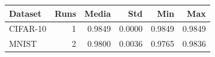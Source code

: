 \begin{tabular}{lrrrrr}
\toprule
Dataset & Runs & Media & Std & Min & Max \\
\midrule
CIFAR-10 & 1 & 0.9849 & 0.0000 & 0.9849 & 0.9849 \\
MNIST & 2 & 0.9800 & 0.0036 & 0.9765 & 0.9836 \\
\bottomrule
\end{tabular}